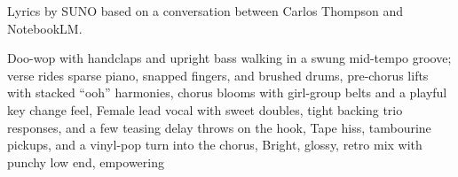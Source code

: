 
\begin{notes}
Lyrics by SUNO based on a conversation between Carlos Thompson and NotebookLM.
\end{notes}
\begin{style}
Doo-wop with handclaps and upright bass walking in a swung mid-tempo groove; verse rides sparse piano, snapped fingers, and brushed drums, pre-chorus lifts with stacked “ooh” harmonies, chorus blooms with girl-group belts and a playful key change feel, Female lead vocal with sweet doubles, tight backing trio responses, and a few teasing delay throws on the hook, Tape hiss, tambourine pickups, and a vinyl-pop turn into the chorus, Bright, glossy, retro mix with punchy low end, empowering
\end{style}
